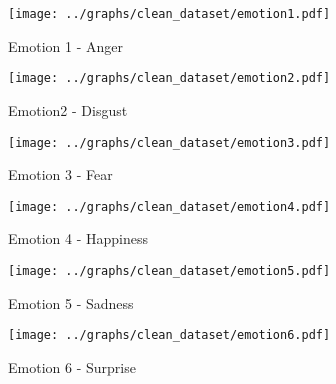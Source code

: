 \begin{figure}[!ht]
\center
	\caption{Emotion 1 - Anger}  
	\texttt{[image: ../graphs/clean\_dataset/emotion1.pdf]}
	 
	
   \label{fig:decisionTrees1}
\end{figure}

\begin{figure}[!ht]
\center
	\caption{Emotion2 - Disgust}  
	\texttt{[image: ../graphs/clean\_dataset/emotion2.pdf]}
	 
	
   \label{fig:decisionTrees2}
\end{figure}

\begin{figure}[!ht]
\center
	\caption{Emotion 3 - Fear}  
	\texttt{[image: ../graphs/clean\_dataset/emotion3.pdf]}
	 
	
   \label{fig:decisionTrees3}
\end{figure}

\begin{figure}[!ht]
\center
	\caption{Emotion 4 - Happiness}  
	\texttt{[image: ../graphs/clean\_dataset/emotion4.pdf]}
	 
	
   \label{fig:decisionTrees4}
\end{figure}

\begin{figure}[!ht]
\center
	\caption{Emotion 5 - Sadness}  
	\texttt{[image: ../graphs/clean\_dataset/emotion5.pdf]}
	 
	
   \label{fig:decisionTrees5}
\end{figure}

\begin{figure}[!ht]
\center
	\caption{Emotion 6 - Surprise}  
	\texttt{[image: ../graphs/clean\_dataset/emotion6.pdf]}
	 
	
   \label{fig:decisionTrees6}
\end{figure}
